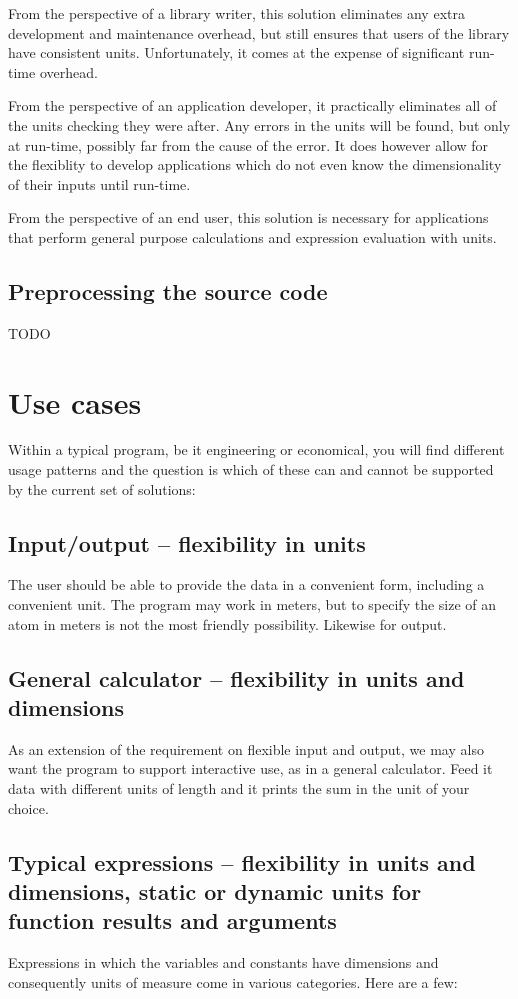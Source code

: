 \documentclass{article}
\begin{document}
From the perspective of a library writer, this solution eliminates any extra development and maintenance overhead,
but still ensures that users of the library have consistent units.
Unfortunately, it comes at the expense of significant run-time overhead.

From the perspective of an application developer, it practically eliminates all of the units checking they were after.
Any errors in the units will be found, but only at run-time, possibly far from the cause of the error.
It does however allow for the flexiblity to develop applications which do not even know the dimensionality of their inputs until run-time.

From the perspective of an end user, this solution is necessary for applications that perform general purpose calculations and expression evaluation with units.

\subsection{Preprocessing the source code}
TODO

\section{Use cases}
\label{UseCases}
Within a typical program, be it engineering or economical, you will find different usage patterns and the question is
which of these can and cannot be supported by the current set of solutions:

\subsection*{Input/output -- flexibility in units}
The user should be able to provide the data in a convenient form, including a convenient unit. The program may work in meters,
but to specify the size of an atom in meters is not the most friendly possibility. Likewise for output.

\subsection*{General calculator -- flexibility in units and dimensions}
As an extension of the requirement on flexible input and output, we may also want the program to support interactive use,
as in a general calculator. Feed it data with different units of length and it prints the sum in the unit of your choice.

\subsection*{Typical expressions -- flexibility in units and dimensions, static or dynamic units for function results and arguments}
Expressions in which the variables and constants have dimensions and consequently units of measure come in various
categories. Here are a few:
\end{document}
